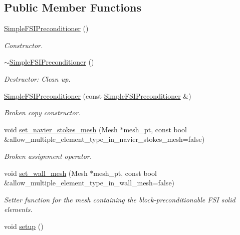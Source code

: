 \subsection*{Public Member Functions}
\begin{DoxyCompactItemize}
\item 
\hyperlink{classoomph_1_1SimpleFSIPreconditioner_a597c5d3292b1e5e9001f8a738f186a73}{Simple\+F\+S\+I\+Preconditioner} ()
\begin{DoxyCompactList}\small\item\em Constructor. \end{DoxyCompactList}\item 
\hyperlink{classoomph_1_1SimpleFSIPreconditioner_a86515bb32fe8a2cdffda1d185751109d}{$\sim$\+Simple\+F\+S\+I\+Preconditioner} ()
\begin{DoxyCompactList}\small\item\em Destructor\+: Clean up. \end{DoxyCompactList}\item 
\hyperlink{classoomph_1_1SimpleFSIPreconditioner_a427e372b3153e9a26aa97c76d69e28a4}{Simple\+F\+S\+I\+Preconditioner} (const \hyperlink{classoomph_1_1SimpleFSIPreconditioner}{Simple\+F\+S\+I\+Preconditioner} \&)
\begin{DoxyCompactList}\small\item\em Broken copy constructor. \end{DoxyCompactList}\item 
void \hyperlink{classoomph_1_1SimpleFSIPreconditioner_ab9c5875d7186cfb5c55cecb72bed50b3}{set\+\_\+navier\+\_\+stokes\+\_\+mesh} (Mesh $\ast$mesh\+\_\+pt, const bool \&allow\+\_\+multiple\+\_\+element\+\_\+type\+\_\+in\+\_\+navier\+\_\+stokes\+\_\+mesh=false)
\begin{DoxyCompactList}\small\item\em Broken assignment operator. \end{DoxyCompactList}\item 
void \hyperlink{classoomph_1_1SimpleFSIPreconditioner_a324b53aaedfc8f0a2cc3da921ef94686}{set\+\_\+wall\+\_\+mesh} (Mesh $\ast$mesh\+\_\+pt, const bool \&allow\+\_\+multiple\+\_\+element\+\_\+type\+\_\+in\+\_\+wall\+\_\+mesh=false)
\begin{DoxyCompactList}\small\item\em Setter function for the mesh containing the block-\/preconditionable F\+SI solid elements. \end{DoxyCompactList}\item 
void \hyperlink{classoomph_1_1SimpleFSIPreconditioner_aaf19c0c3f19f6d8ef4f36a1581829230}{setup} ()

\end{DoxyCompactItemize}
